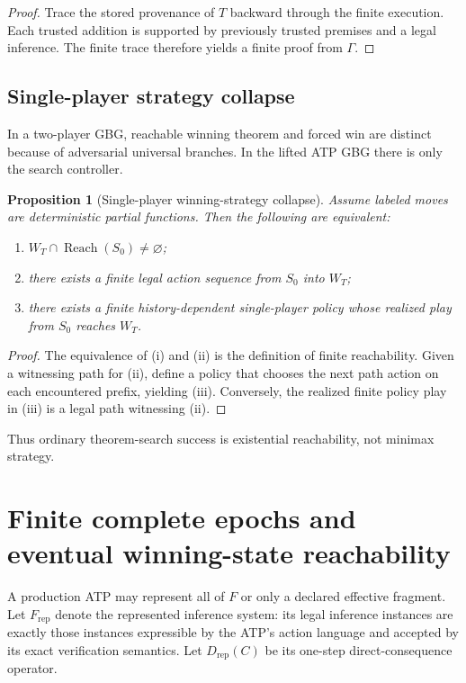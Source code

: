 \documentclass[11pt]{article}
\newtheorem{proposition}[theorem]{Proposition}
\theoremstyle{definition}
\newcommand{\Reach}{\operatorname{Reach}}
\begin{document}
\begin{proof}
Trace the stored provenance of $T$ backward through the finite execution. Each trusted addition is supported by previously trusted premises and a legal inference. The finite trace therefore yields a finite proof from $\Gamma$.
\end{proof}

\subsection{Single-player strategy collapse}

In a two-player GBG, reachable winning theorem and forced win are distinct because of adversarial universal branches. In the lifted ATP GBG there is only the search controller.

\begin{proposition}[Single-player winning-strategy collapse]\label{prop:single-player-collapse}
Assume labeled moves are deterministic partial functions. Then the following are equivalent:
\begin{enumerate}[label=(\roman*)]
\item $W_T\cap\Reach(S_0)\neq\varnothing$;
\item there exists a finite legal action sequence from $S_0$ into $W_T$;
\item there exists a finite history-dependent single-player policy whose realized play from $S_0$ reaches $W_T$.
\end{enumerate}
\end{proposition}

\begin{proof}
The equivalence of (i) and (ii) is the definition of finite reachability. Given a witnessing path for (ii), define a policy that chooses the next path action on each encountered prefix, yielding (iii). Conversely, the realized finite policy play in (iii) is a legal path witnessing (ii).
\end{proof}

Thus ordinary theorem-search success is existential reachability, not minimax strategy.

\section{Finite complete epochs and eventual winning-state reachability}

A production ATP may represent all of $F$ or only a declared effective fragment. Let $F_{\mathrm{rep}}$ denote the represented inference system: its legal inference instances are exactly those instances expressible by the ATP's action language and accepted by its exact verification semantics. Let $D_{\mathrm{rep}}(C)$ be its one-step direct-consequence operator.
\end{document}
